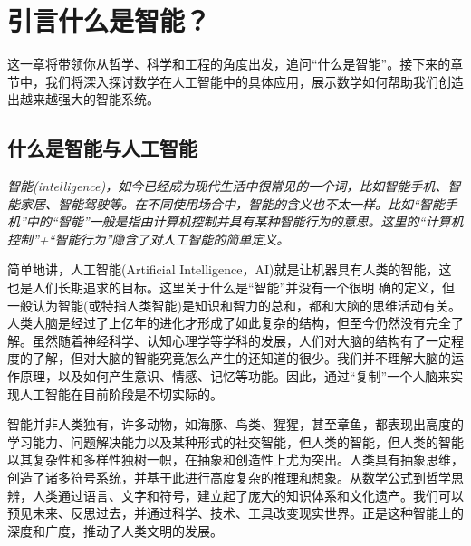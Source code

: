 \chapter*{ 引言\quad 什么是智能？}


这一章将带领你从哲学、科学和工程的角度出发，追问“什么是智能”。接下来的章节中，我们将深入探讨数学在人工智能中的具体应用，展示数学如何帮助我们创造出越来越强大的智能系统。

\section{什么是智能与人工智能}

{\em 智能(intelligence)，如今已经成为现代生活中很常见的一个词，比如智能手机、智能家居、智能驾驶等。在不同使用场合中，智能的含义也不太一样。比如“智能手机”中的“智能”一般是指由计算机控制并具有某种智能行为的意思。这里的“计算机控制”+“智能行为”隐含了对人工智能的简单定义。

简单地讲，人工智能(Artificial Intelligence，AI)就是让机器具有人类的智能，这也是人们长期追求的目标。这里关于什么是“智能”并没有一个很明 确的定义，但一般认为智能(或特指人类智能)是知识和智力的总和，都和大脑的思维活动有关。人类大脑是经过了上亿年的进化才形成了如此复杂的结构，但至今仍然没有完全了解。虽然随着神经科学、认知心理学等学科的发展，人们对大脑的结构有了一定程度的了解，但对大脑的智能究竟怎么产生的还知道的很少。我们并不理解大脑的运作原理，以及如何产生意识、情感、记忆等功能。因此，通过“复制”一个人脑来实现人工智能在目前阶段是不切实际的。}


智能并非人类独有，许多动物，如海豚、鸟类、猩猩，甚至章鱼，都表现出高度的学习能力、问题解决能力以及某种形式的社交智能，但人类的智能，但人类的智能以其复杂性和多样性独树一帜，在抽象和创造性上尤为突出。人类具有抽象思维，创造了诸多符号系统，并基于此进行高度复杂的推理和想象。从数学公式到哲学思辨，人类通过语言、文字和符号，建立起了庞大的知识体系和文化遗产。我们可以预见未来、反思过去，并通过科学、技术、工具改变现实世界。正是这种智能上的深度和广度，推动了人类文明的发展。


